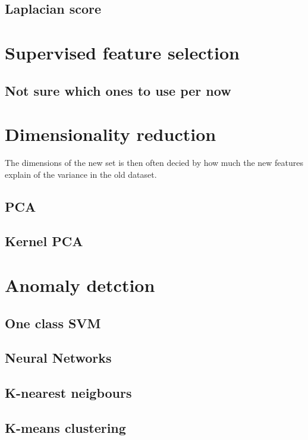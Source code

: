     \subsection{Laplacian score}
    
    

\section{Supervised feature selection}\label{sec:sup_feat_reduc}

    \subsection{Not sure which ones to use per now}
    

\section{Dimensionality reduction}\label{sec:dim_red}
The dimensions of the new set is then often decied by how much the new features explain of the variance in the old dataset. 
    \subsection{PCA}\label{subsec:PCA}
    
    \subsection{Kernel PCA}\label{subsec:kernelPCA}


\section{Anomaly detction}\label{sec:Anomaly_detection}
    
    \subsection{One class SVM}\label{subsec:OCSVM}
    
    \subsection{Neural Networks}\label{subsec:NN}
    
    \subsection{K-nearest neigbours}\label{subsec:k_neig}
    
    \subsection{K-means clustering}\label{subsec:k_means}
    